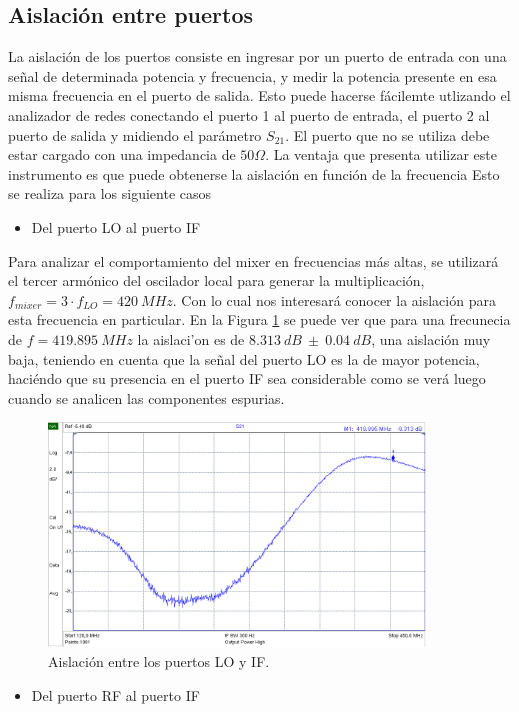 \documentclass[a4paper,10pt]{article}
\begin{document}
	\subsection{Aislación entre puertos}
	La aislaci\'on de los puertos consiste en ingresar por un puerto de entrada con una se\~nal de determinada potencia y frecuencia, y medir la potencia presente en esa misma frecuencia en el puerto de salida. Esto puede hacerse f\'acilemte utlizando el analizador de redes conectando el puerto 1 al puerto de entrada, el puerto 2 al puerto de salida y midiendo el par\'ametro $S_{21}$. El puerto que no se utiliza debe estar cargado con una impedancia de $50\Omega$. La ventaja que presenta utilizar este instrumento es que puede obtenerse la aislaci\'on en funci\'on de la frecuencia
	Esto se realiza para los siguiente casos
	\begin{itemize}
	\item Del puerto LO al puerto IF
	\end{itemize}
	Para analizar el comportamiento del mixer en frecuencias m\'as altas, se utilizar\'a el tercer arm\'onico del oscilador local para generar la multiplicaci\'on, $f_{mixer}=3\cdot f_{LO}=420~MHz$. Con lo cual nos interesar\'a conocer la aislaci\'on para esta frecuencia en particular.
	En la Figura \ref{isolation1} se puede ver que para una frecunecia de $f=419.895~MHz$ la aislaci'on es de $8.313~dB~\pm~0.04~dB$, una aislaci\'on muy baja, teniendo en cuenta que la se\~nal del puerto LO es la de mayor potencia, haci\'endo que su presencia en el puerto IF sea considerable como se ver\'a luego cuando se analicen las componentes espurias.
	\begin{figure}[!htb]
		\centering
		\includegraphics[width=10cm]{Images/aislacion1.png}
		\caption{Aislaci\'on entre los puertos LO y IF.}
		\label{isolation1}
	\end{figure}	
	\begin{itemize}
	\item Del puerto RF al puerto IF
	\end{itemize}
\end{document}
